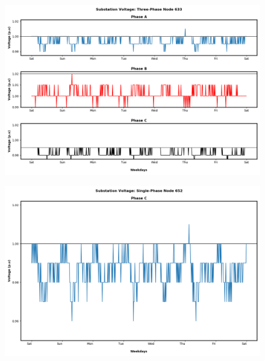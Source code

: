 \begin{figure}[H]
    \centering
    \includegraphics[width=1.1\columnwidth]{Pictures/sixty_three_phase_633_volt.png}
    \caption{ }
\end{figure}
\newpage





\begin{figure}[H]
    \centering
    \includegraphics[width=1.1\columnwidth]{Pictures/eighty_single_phase_652_volt.png}
    \caption{ }
\end{figure}

\newpage

